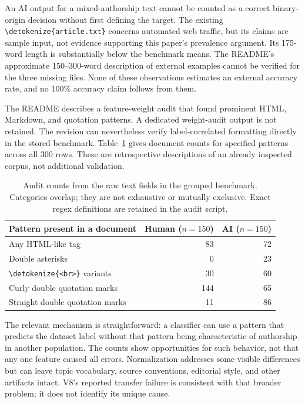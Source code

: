 \documentclass[11pt]{article}
\newcommand{\code}[1]{\expandafter\nolinkurl\expandafter{\detokenize{#1}}}
\begin{document}
An AI output for a mixed-authorship text cannot be counted as a correct
binary-origin decision without first defining the target. The existing
\code{article.txt} concerns automated web traffic, but its claims are sample
input, not evidence supporting this paper's prevalence argument. Its
175-word length is substantially below the benchmark means. The README's
approximate 150--300-word description of external examples cannot be
verified for the three missing files. None of these observations estimates
an external accuracy rate, and no 100\% accuracy claim follows from them.

The README describes a feature-weight audit that found prominent HTML,
Markdown, and quotation patterns. A dedicated weight-audit output is not
retained. The revision can nevertheless verify label-correlated formatting
directly in the stored benchmark. Table~\ref{tab:formatting} gives document
counts for specified patterns across all 300 rows. These are retrospective
descriptions of an already inspected corpus, not additional validation.

\begin{table}[htbp]
\centering\small
\begin{tabular}{lrr}
\toprule
Pattern present in a document & Human ($n=150$) & AI ($n=150$) \\
\midrule
Any HTML-like tag & 83 & 72 \\
Double asterisks & 0 & 23 \\
\code{<br>} variants & 30 & 60 \\
Curly double quotation marks & 144 & 65 \\
Straight double quotation marks & 11 & 86 \\
\bottomrule
\end{tabular}
\caption{Audit counts from the raw text fields in the grouped benchmark.
Categories overlap; they are not exhaustive or mutually exclusive. Exact
regex definitions are retained in the audit script.}
\label{tab:formatting}
\end{table}

The relevant mechanism is straightforward: a classifier can use a pattern
that predicts the dataset label without that pattern being characteristic
of authorship in another population. The counts show opportunities for
such behavior, not that any one feature caused all errors. Normalization
addresses some visible differences but can leave topic vocabulary, source
conventions, editorial style, and other artifacts intact. V8's reported
transfer failure is consistent with that broader problem; it does not
identify its unique cause.
\end{document}

